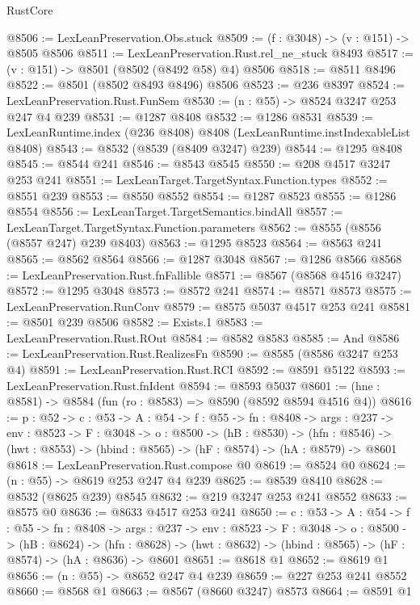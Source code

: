\begin{lexlean}{RustCore}
\begin{coremodule}
@8506 := LexLeanPreservation.Obs.stuck
@8509 := (f : @3048) -> (v : @151) -> @8505 @8506
@8511 := LexLeanPreservation.Rust.rel_ne_stuck @8493
@8517 := (v : @151) -> @8501 (@8502 (@8492 @58) @4) @8506
@8518 := @8511 @8496
@8522 := @8501 (@8502 @8493 @8496) @8506
@8523 := @236 @8397
@8524 := LexLeanPreservation.Rust.FunSem
@8530 := (n : @55) -> @8524 @3247 @253 @247 @4 @239
@8531 := @1287 @8408
@8532 := @1286 @8531
@8539 := LexLeanRuntime.index (@236 @8408) @8408 (LexLeanRuntime.instIndexableList @8408)
@8543 := @8532 (@8539 (@8409 @3247) @239)
@8544 := @1295 @8408
@8545 := @8544 @241
@8546 := @8543 @8545
@8550 := @208 @4517 @3247 @253 @241
@8551 := LexLeanTarget.TargetSyntax.Function.types
@8552 := @8551 @239
@8553 := @8550 @8552
@8554 := @1287 @8523
@8555 := @1286 @8554
@8556 := LexLeanTarget.TargetSemantics.bindAll
@8557 := LexLeanTarget.TargetSyntax.Function.parameters
@8562 := @8555 (@8556 (@8557 @247) @239 @8403)
@8563 := @1295 @8523
@8564 := @8563 @241
@8565 := @8562 @8564
@8566 := @1287 @3048
@8567 := @1286 @8566
@8568 := LexLeanPreservation.Rust.fnFallible
@8571 := @8567 (@8568 @4516 @3247)
@8572 := @1295 @3048
@8573 := @8572 @241
@8574 := @8571 @8573
@8575 := LexLeanPreservation.RunConv
@8579 := @8575 @5037 @4517 @253 @241
@8581 := @8501 @239 @8506
@8582 := Exists.{1}
@8583 := LexLeanPreservation.Rust.ROut
@8584 := @8582 @8583
@8585 := And
@8586 := LexLeanPreservation.Rust.RealizesFn
@8590 := @8585 (@8586 @3247 @253 @4)
@8591 := LexLeanPreservation.Rust.RCI
@8592 := @8591 @5122
@8593 := LexLeanPreservation.Rust.fnIdent
@8594 := @8593 @5037
@8601 := (hne : @8581) -> @8584 (fun (ro : @8583) => @8590 (@8592 @8594 @4516 @4))
@8616 := {p : @52} ->
  {c : @53} ->
  {A : @54} ->
  {f : @55} ->
  {fn : @8408} ->
  {args : @237} ->
  {env : @8523} ->
  {F : @3048} ->
  {o : @8500} ->
  (hB : @8530) ->
  (hfn : @8546) -> (hwt : @8553) -> (hbind : @8565) -> (hF : @8574) -> (hA : @8579) -> @8601
@8618 := LexLeanPreservation.Rust.compose @0
@8619 := @8524 @0
@8624 := (n : @55) -> @8619 @253 @247 @4 @239
@8625 := @8539 @8410
@8628 := @8532 (@8625 @239) @8545
@8632 := @219 @3247 @253 @241 @8552
@8633 := @8575 @0
@8636 := @8633 @4517 @253 @241
@8650 := {c : @53} ->
  {A : @54} ->
  {f : @55} ->
  {fn : @8408} ->
  {args : @237} ->
  {env : @8523} ->
  {F : @3048} ->
  {o : @8500} ->
  (hB : @8624) ->
  (hfn : @8628) -> (hwt : @8632) -> (hbind : @8565) -> (hF : @8574) -> (hA : @8636) -> @8601
@8651 := @8618 @1
@8652 := @8619 @1
@8656 := (n : @55) -> @8652 @247 @4 @239
@8659 := @227 @253 @241 @8552
@8660 := @8568 @1
@8663 := @8567 (@8660 @3247) @8573
@8664 := @8591 @1

\end{coremodule}
\end{lexlean}
